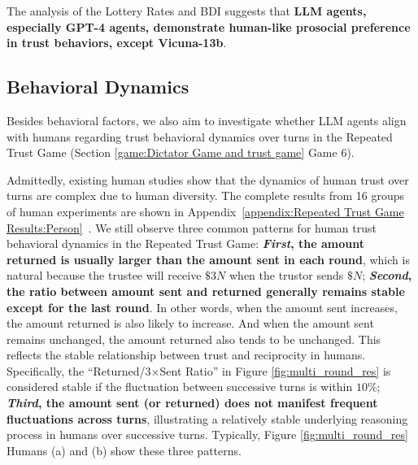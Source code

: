 The analysis of the Lottery Rates and BDI suggests that \textbf{LLM agents, especially GPT-4 agents,  demonstrate human-like prosocial preference in trust behaviors, except Vicuna-13b}.













\vspace{-0.2cm}
\subsection{Behavioral Dynamics}
\label{bahavior_dynamic}
\vspace{-1mm}
Besides behavioral factors, we also aim to investigate whether LLM agents align with humans regarding trust behavioral dynamics over turns in the Repeated Trust Game (Section \ref{game:Dictator Game and trust game} Game 6).

Admittedly, existing human studies show that the dynamics of human trust over turns are complex due to human diversity. The complete results from 16 groups of human experiments are shown in Appendix~\ref{appendix:Repeated Trust Game Results:Person}~\citep{jones1998experience}. We still observe three common  patterns for human trust behavioral dynamics in the Repeated Trust Game: \textbf{\textit{First}, the amount returned is usually larger than the amount sent in each round}, which is natural because the trustee will receive $\$3N$ when the trustor sends $\$N$; \textbf{\textit{Second}, the ratio between amount sent and returned generally remains stable except for the last round}. In other words, when the amount sent increases, the amount returned is also likely to increase. And when the amount sent remains unchanged, the amount returned also tends to be unchanged. This reflects the stable relationship between trust and reciprocity in humans. Specifically, the ``Returned/3$\times$Sent Ratio'' in Figure \ref{fig:multi_round_res} is considered stable if the fluctuation between successive turns is within $10\%$; \textbf{\textit{Third}, the amount sent (or returned) does not manifest frequent fluctuations across turns}, illustrating a relatively stable underlying reasoning process in humans over successive turns. Typically, Figure \ref{fig:multi_round_res} Humans (a) and (b) show these three  patterns.

